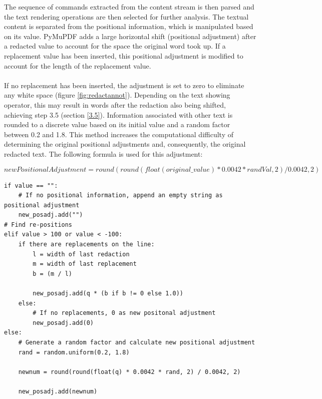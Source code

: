 The sequence of commands extracted from the content stream is then parsed and the text rendering operations are then selected for further analysis. The textual content is separated from the positional information, which is manipulated based on its value. PyMuPDF adds a large horizontal shift (positional adjustment) after a redacted value to account for the space the original word took up. If a replacement value has been inserted, this positional adjustment is modified to account for the length of the replacement value.
\\\\
If no replacement has been inserted, the adjustment is set to zero to eliminate any white space (figure \ref{fig:redactannot}). Depending on the text showing operator, this may result in words after the redaction also being shifted, achieving step 3.5 (section \ref{3.5}). Information associated with other text is rounded to a discrete value based on its initial value and a random factor between 0.2 and 1.8. This method increases the computational difficulty of determining the original positional adjustments and, consequently, the original redacted text. The following formula is used for this adjustment:

\[newPositionalAdjustment = round(round(float(original\_value) * 0.0042 * randVal, 2) / 0.0042, 2)\]

\begin{lstlisting}[style=CStyle, caption=Pseudocode for manipulating possible positional adjustments based on value. A really big or really small value may be found which indicated that PyMuPDF has inserted a new value after redaction. A new positional adjustment is calculated based on the last redaction and replacement value. Other values are rounded to the nearest discrete value based on the initial value and a random factor.]
if value == "":
    # If no positional information, append an empty string as positional adjustment
    new_posadj.add("")
# Find re-positions
elif value > 100 or value < -100:
    if there are replacements on the line:
        l = width of last redaction
        m = width of last replacement
        b = (m / l)

        new_posadj.add(q * (b if b != 0 else 1.0))
    else:
        # If no replacements, 0 as new positonal adjustment
        new_posadj.add(0)
else:
    # Generate a random factor and calculate new positional adjustment
    rand = random.uniform(0.2, 1.8)
    
    newnum = round(round(float(q) * 0.0042 * rand, 2) / 0.0042, 2)
    
    new_posadj.add(newnum)
\end{lstlisting}

